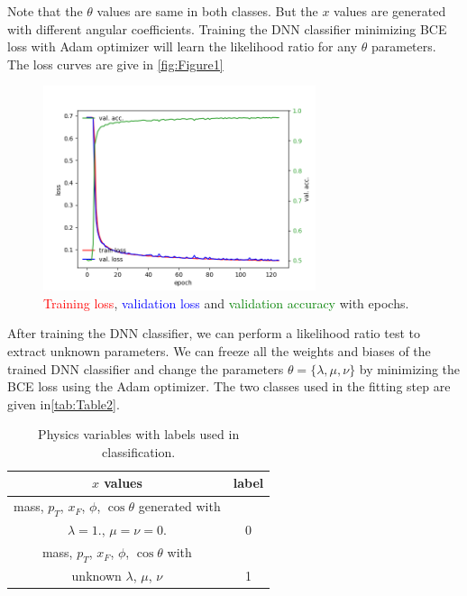 \documentclass{article}
\begin{document}
Note that the $\theta$ values are same in both classes. But the $x$ values are generated with different angular coefficients. Training the DNN classifier minimizing BCE loss with Adam optimizer\cite{kingma2014adam} will learn the likelihood ratio for any $\theta$ parameters. The loss curves are give in \autoref{fig:Figure1}

\begin{figure}[H]
\begin{center}
	\includegraphics[width=8.0cm]{imgs/train_test_loss.png}
	\caption{\textcolor{red}{Training loss}, \textcolor{blue}{validation loss} and \textcolor{green}{validation accuracy} with epochs.}
	\label{fig:Figure1}
\end{center}
\end{figure}

After training the DNN classifier, we can perform a likelihood ratio test to extract unknown parameters. We can freeze all the weights and biases of the trained DNN classifier and change the parameters $\theta = \{\lambda, \mu, \nu\}$ by minimizing the BCE loss using the Adam optimizer. The two classes used in the fitting step are given in\autoref{tab:Table2}.

\begin{table}[H]
\begin{center}
\begin{tabular}{ |c|c| } 
 \hline
 $x$ values & label \\ 
 \hline
 mass, $p_{T}$, $x_{F}$, $\phi$, $\cos\theta$ generated with & \\
 $\lambda = 1.$, $\mu = \nu = 0.$ & 0 \\
\hline
mass, $p_{T}$, $x_{F}$, $\phi$, $\cos\theta$ with  &\\
unknown $\lambda$, $\mu$,  $\nu$ & 1 \\ 
\hline
\end{tabular}
\caption{Physics variables with labels used in classification.}
\label{tab:Table2}
\end{center}
\end{table}
\end{document}
